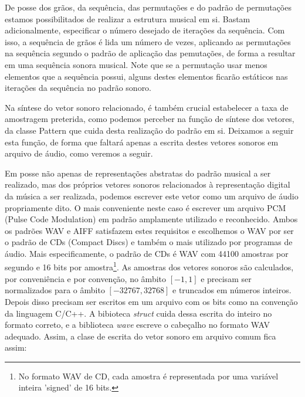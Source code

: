 
De posse dos grãos, da sequência, das permutações e do padrão de permutações estamos possibilitados de realizar a estrutura musical em si. Bastam adicionalmente, especificar o número desejado de iterações da sequência. Com isso, a sequência de grãos é lida um número de vezes, aplicando as permutações na sequência segundo o padrão de aplicação das pemutações, de forma a resultar em uma sequência sonora musical. Note que se a permutação usar menos elementos que a sequência possui, alguns destes elementos ficarão estáticos nas iterações da sequência no padrão sonoro.

Na síntese do vetor sonoro relacionado, é também crucial estabelecer a taxa de amostragem preterida, como podemos perceber na função de síntese dos vetores, da classe Pattern que cuida desta realização do padrão em si. Deixamos a seguir esta função, de forma que faltará apenas a escrita destes vetores sonoros em arquivo de áudio, como veremos a seguir.


Em posse não apenas de representações abstratas do padrão musical a ser realizado, mas dos próprios vetores sonoros relacionados à representação digital da música a ser realizada, podemos escrever este vetor como um arquivo de áudio propriamente dito. O mais conveniente neste caso é escrever um arquivo PCM (Pulse Code Modulation) em padrão amplamente utilizado e reconhecido. Ambos os padrões WAV e AIFF satisfazem estes requisitos e escolhemos o WAV por ser o padrão de CDs (Compact Discs) e também o mais utilizado por programas de áudio. Mais especificamente, o padrão de CDs é WAV com 44100 amostras por segundo e 16 bits por amostra\footnote{No formato WAV de CD, cada amostra é representada por uma variável inteira 'signed' de 16 bits.}. As amostras dos vetores sonoros são calculados, por conveniência e por convenção, no âmbito $[-1,1]$ e precisam ser normalizados para o âmbito $[-32767,32768]$ e truncados em números inteiros. Depois disso precisam ser escritos em um arquivo com os bits como na convenção da linguagem C/C++. A bibioteca \emph{struct} cuida dessa escrita do inteiro no formato correto, e a biblioteca \emph{wave} escreve o cabeçalho no formato WAV adequado. Assim, a clase de escrita do vetor sonoro em arquivo comum fica assim:


